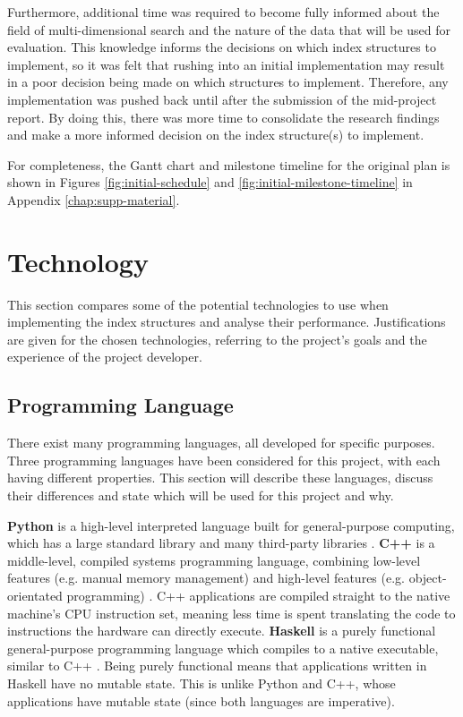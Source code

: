 Furthermore, additional time was required to become fully informed about the field of multi-dimensional search and the nature of the data that will be used for evaluation. This knowledge informs the decisions on which index structures to implement, so it was felt that rushing into an initial implementation may result in a poor decision being made on which structures to implement. Therefore, any implementation was pushed back until after the submission of the mid-project report. By doing this, there was more time to consolidate the research findings and make a more informed decision on the index structure(s) to implement.

For completeness, the Gantt chart and milestone timeline for the original plan is shown in Figures \ref{fig:initial-schedule} and \ref{fig:initial-milestone-timeline} in Appendix \ref{chap:supp-material}.

\section{Technology}

This section compares some of the potential technologies to use when implementing the index structures and analyse their performance. Justifications are given for the chosen technologies, referring to the project's goals and the experience of the project developer.

\subsection{Programming Language}

There exist many programming languages, all developed for specific purposes. Three programming languages have been considered for this project, with each having different properties. This section will describe these languages, discuss their differences and state which will be used for this project and why.

\textbf{Python} is a high-level interpreted language built for general-purpose computing, which has a large standard library and many third-party libraries \cite{python}. \textbf{C++} is a middle-level, compiled systems programming language, combining low-level features (e.g. manual memory management) and high-level features (e.g. object-orientated programming) \cite{cpp}. C++ applications are compiled straight to the native machine's CPU instruction set, meaning less time is spent translating the code to instructions the hardware can directly execute. \textbf{Haskell} is a purely functional general-purpose programming language which compiles to a native executable, similar to C++ \cite{haskell}. Being purely functional means that applications written in Haskell have no mutable state. This is unlike Python and C++, whose applications have mutable state (since both languages are imperative).

